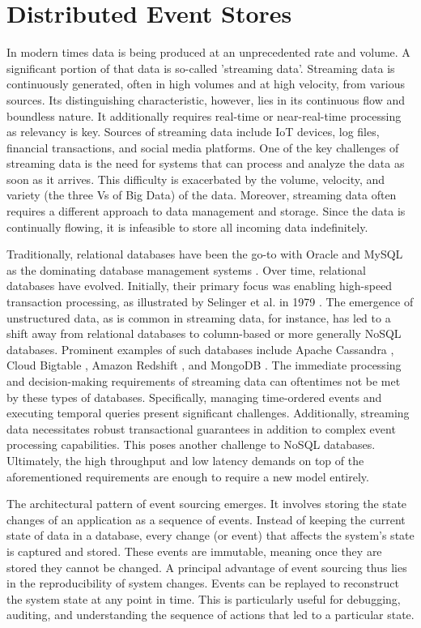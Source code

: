 \section{Distributed Event Stores}
In modern times data is being produced at an unprecedented rate and volume. A significant portion of that data is so-called 'streaming data'. Streaming data is continuously generated, often in high volumes and at high velocity, from various sources. Its distinguishing characteristic, however, lies in its continuous flow and boundless nature. It additionally requires real-time or near-real-time processing as relevancy is key. Sources of streaming data include \ac{IoT} devices, log files, financial transactions, and social media platforms. One of the key challenges of streaming data is the need for systems that can process and analyze the data as soon as it arrives. This difficulty is exacerbated by the volume, velocity, and variety (the three Vs of Big Data) of the data. Moreover, streaming data often requires a different approach to data management and storage. Since the data is continually flowing, it is infeasible to store all incoming data indefinitely. \par
Traditionally, relational databases have been the go-to with Oracle \cite{oracle} and MySQL \cite{mysql} as the dominating database management systems \cite{dbms_statistics}. Over time, relational databases have evolved. Initially, their primary focus was enabling high-speed transaction processing, as illustrated by Selinger et al. in 1979 \cite{selinger1979access}. The emergence of unstructured data, as is common in streaming data, for instance, has led to a shift away from relational databases to column-based or more generally NoSQL databases. Prominent examples of such databases include Apache Cassandra \cite{cassandra}, Cloud Bigtable \cite{cloud_bigtable}, Amazon Redshift \cite{amazon_redshift}, and MongoDB \cite{mongo_db}. The immediate processing and decision-making requirements of streaming data can oftentimes not be met by these types of databases. Specifically, managing time-ordered events and executing temporal queries present significant challenges. Additionally, streaming data necessitates robust transactional guarantees in addition to complex event processing capabilities. This poses another challenge to NoSQL databases. Ultimately, the high throughput and low latency demands on top of the aforementioned requirements are enough to require a new model entirely. \par
The architectural pattern of event sourcing emerges. It involves storing the state changes of an application as a sequence of events. Instead of keeping the current state of data in a database, every change (or event) that affects the system's state is captured and stored. These events are immutable, meaning once they are stored they cannot be changed. A principal advantage of event sourcing thus lies in the reproducibility of system changes. Events can be replayed to reconstruct the system state at any point in time. This is particularly useful for debugging, auditing, and understanding the sequence of actions that led to a particular state. \par
